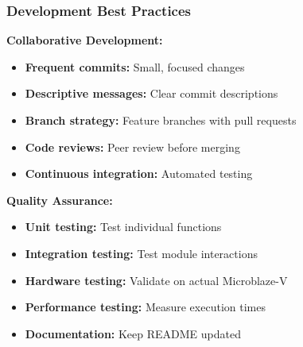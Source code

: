 \documentclass{beamer}
\begin{document}
\begin{frame}
\frametitle{Development Best Practices}
\small \textbf{Collaborative Development:}
\begin{itemize}
    \item \footnotesize \textbf{Frequent commits:} Small, focused changes
    \item \footnotesize \textbf{Descriptive messages:} Clear commit descriptions
    \item \footnotesize \textbf{Branch strategy:} Feature branches with pull requests
    \item \footnotesize \textbf{Code reviews:} Peer review before merging
    \item \footnotesize \textbf{Continuous integration:} Automated testing
\end{itemize}

\vspace{0.3cm}
\small \textbf{Quality Assurance:}
\begin{itemize}
    \item \footnotesize \textbf{Unit testing:} Test individual functions
    \item \footnotesize \textbf{Integration testing:} Test module interactions
    \item \footnotesize \textbf{Hardware testing:} Validate on actual Microblaze-V
    \item \footnotesize \textbf{Performance testing:} Measure execution times
    \item \footnotesize \textbf{Documentation:} Keep README updated
\end{itemize}
\end{frame}
\end{document}
